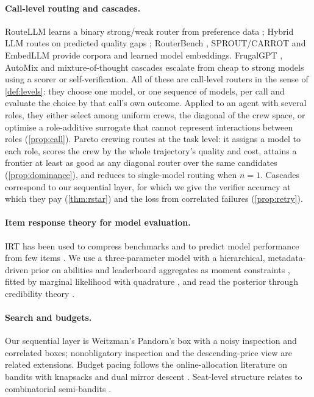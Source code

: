 \documentclass[11pt,a4paper]{article}
\theoremstyle{definition}
\theoremstyle{remark}
\theoremstyle{definition}
\begin{document}
\paragraph{Call-level routing and cascades.}
RouteLLM learns a binary strong/weak router from preference data \cite{ong2024routellm}; Hybrid LLM routes on predicted quality gaps \cite{ding2024hybrid}; RouterBench \cite{hu2024routerbench}, SPROUT/CARROT \cite{somerstep2025carrot} and EmbedLLM \cite{zhuang2025embedllm} provide corpora and learned model embeddings. FrugalGPT \cite{chen2023frugalgpt}, AutoMix \cite{madaan2024automix} and mixture-of-thought cascades \cite{yue2024cascades} escalate from cheap to strong models using a scorer or self-verification. All of these are call-level routers in the sense of \cref{def:levels}: they choose one model, or one sequence of models, per call and evaluate the choice by that call's own outcome. Applied to an agent with several roles, they either select among uniform crews, the diagonal of the crew space, or optimise a role-additive surrogate that cannot represent interactions between roles (\cref{prop:call}). Pareto crewing routes at the task level: it assigns a model to each role, scores the crew by the whole trajectory's quality and cost, attains a frontier at least as good as any diagonal router over the same candidates (\cref{prop:dominance}), and reduces to single-model routing when $n=1$. Cascades correspond to our sequential layer, for which we give the verifier accuracy at which they pay (\cref{thm:rstar}) and the loss from correlated failures (\cref{prop:retry}).

\paragraph{Item response theory for model evaluation.}
IRT has been used to compress benchmarks and to predict model performance from few items \cite{polo2024tinybenchmarks}. We use a three-parameter model with a hierarchical, metadata-driven prior on abilities and leaderboard aggregates as moment constraints \cite{quadrianto2009,hansen1982gmm}, fitted by marginal likelihood with quadrature \cite{bock1981}, and read the posterior through credibility theory \cite{buhlmann1967}.

\paragraph{Search and budgets.}
Our sequential layer is Weitzman's Pandora's box \cite{weitzman1979} with a noisy inspection and correlated boxes; nonobligatory inspection \cite{doval2018} and the descending-price view \cite{kleinberg2016} are related extensions. Budget pacing follows the online-allocation literature on bandits with knapsacks \cite{badanidiyuru2018,agrawal2014} and dual mirror descent \cite{balseiro2020}. Seat-level structure relates to combinatorial semi-bandits \cite{chen2013cmab}.
\end{document}
